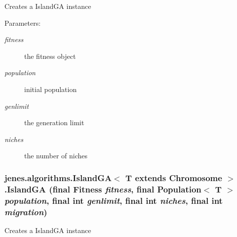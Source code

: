 Creates a IslandGA instance

\begin{Desc}
\item[Parameters:]
\begin{description}
\item[{\em fitness}]the fitness object \item[{\em population}]initial population \item[{\em genlimit}]the generation limit \item[{\em niches}]the number of niches \end{description}
\end{Desc}
\hypertarget{classjenes_1_1algorithms_1_1_island_g_a_3_01_t_01extends_01_chromosome_01_4_183f962ceb12d8cd2885b0ef4a6dd988}{
\subsubsection[IslandGA]{\setlength{\rightskip}{0pt plus 5cm}jenes.algorithms.IslandGA$<$ T extends Chromosome $>$.IslandGA (final Fitness {\em fitness}, \/  final Population$<$ T $>$ {\em population}, \/  final int {\em genlimit}, \/  final int {\em niches}, \/  final int {\em migration})}}
\label{classjenes_1_1algorithms_1_1_island_g_a_3_01_t_01extends_01_chromosome_01_4_183f962ceb12d8cd2885b0ef4a6dd988}


Creates a IslandGA instance

